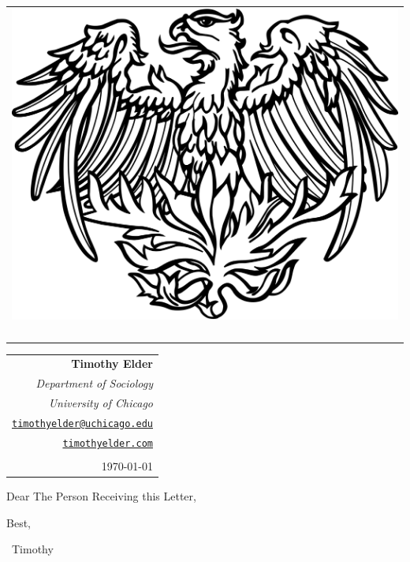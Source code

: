 \documentclass{article}
\makeatletter
\def\myaddress{Department of Sociology}
\def\myemail{timothyelder@uchicago.edu}
\def\mysite{timothyelder.com}
\makeatother
\begin{document}
\begin{tabular}[t]{@{} l @{}}
  \includegraphics[height=7\normalbaselineskip,valign=t]{classic.phoenix.rgb.black} \\
  \\
  \bfseries \\ %
  \itshape \\ %
  \itshape %
\end{tabular}
%
\hfill
\begin{tabular}[t]{@{} r @{}}
  \bfseries Timothy Elder \\
  \itshape {\myaddress} \\
  \itshape University of Chicago \\
   \texttt{\href{mailto:\myemail}{\myemail}} \\
   \texttt{\href{http://timothyelder.com/}{\mysite}} \\
  \\
  \today %
\end{tabular}

\bigskip

Dear The Person Receiving this Letter,

\lipsum[2-4]

Best,

\bigskip

\, Timothy
\end{document}
